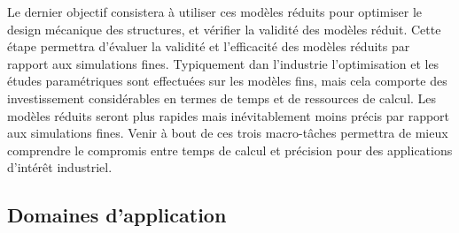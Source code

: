 \documentclass[french]{article}
\begin{document}
Le dernier objectif consistera à utiliser ces modèles réduits pour optimiser le design
mécanique des structures, et vérifier la validité des modèles réduit. Cette étape permettra
d’évaluer la validité et l’efficacité des modèles réduits par rapport aux simulations fines.
Typiquement dan l'industrie l’optimisation et les études paramétriques sont effectuées sur les
modèles fins, mais cela comporte des investissement considérables en termes de temps et de
ressources de calcul. Les modèles réduits seront plus rapides mais inévitablement
moins précis par rapport aux simulations fines. Venir à bout de ces trois macro-tâches
permettra de mieux comprendre le compromis entre temps de calcul et précision pour des
applications d’intérêt industriel. 

\subsection{Domaines d'application}
\end{document}
